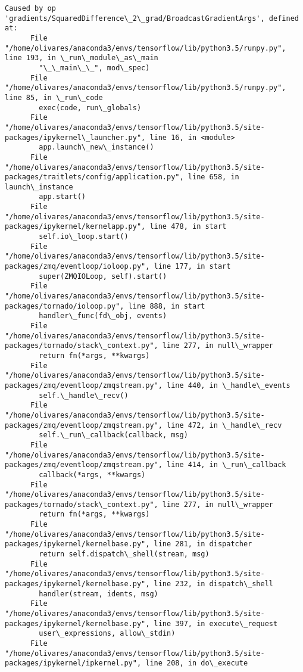 \documentclass[11pt]{article}
\begin{document}
\begin{Verbatim}[commandchars=\\\{\}]
    Caused by op 'gradients/SquaredDifference\_2\_grad/BroadcastGradientArgs', defined at:
      File "/home/olivares/anaconda3/envs/tensorflow/lib/python3.5/runpy.py", line 193, in \_run\_module\_as\_main
        "\_\_main\_\_", mod\_spec)
      File "/home/olivares/anaconda3/envs/tensorflow/lib/python3.5/runpy.py", line 85, in \_run\_code
        exec(code, run\_globals)
      File "/home/olivares/anaconda3/envs/tensorflow/lib/python3.5/site-packages/ipykernel\_launcher.py", line 16, in <module>
        app.launch\_new\_instance()
      File "/home/olivares/anaconda3/envs/tensorflow/lib/python3.5/site-packages/traitlets/config/application.py", line 658, in launch\_instance
        app.start()
      File "/home/olivares/anaconda3/envs/tensorflow/lib/python3.5/site-packages/ipykernel/kernelapp.py", line 478, in start
        self.io\_loop.start()
      File "/home/olivares/anaconda3/envs/tensorflow/lib/python3.5/site-packages/zmq/eventloop/ioloop.py", line 177, in start
        super(ZMQIOLoop, self).start()
      File "/home/olivares/anaconda3/envs/tensorflow/lib/python3.5/site-packages/tornado/ioloop.py", line 888, in start
        handler\_func(fd\_obj, events)
      File "/home/olivares/anaconda3/envs/tensorflow/lib/python3.5/site-packages/tornado/stack\_context.py", line 277, in null\_wrapper
        return fn(*args, **kwargs)
      File "/home/olivares/anaconda3/envs/tensorflow/lib/python3.5/site-packages/zmq/eventloop/zmqstream.py", line 440, in \_handle\_events
        self.\_handle\_recv()
      File "/home/olivares/anaconda3/envs/tensorflow/lib/python3.5/site-packages/zmq/eventloop/zmqstream.py", line 472, in \_handle\_recv
        self.\_run\_callback(callback, msg)
      File "/home/olivares/anaconda3/envs/tensorflow/lib/python3.5/site-packages/zmq/eventloop/zmqstream.py", line 414, in \_run\_callback
        callback(*args, **kwargs)
      File "/home/olivares/anaconda3/envs/tensorflow/lib/python3.5/site-packages/tornado/stack\_context.py", line 277, in null\_wrapper
        return fn(*args, **kwargs)
      File "/home/olivares/anaconda3/envs/tensorflow/lib/python3.5/site-packages/ipykernel/kernelbase.py", line 281, in dispatcher
        return self.dispatch\_shell(stream, msg)
      File "/home/olivares/anaconda3/envs/tensorflow/lib/python3.5/site-packages/ipykernel/kernelbase.py", line 232, in dispatch\_shell
        handler(stream, idents, msg)
      File "/home/olivares/anaconda3/envs/tensorflow/lib/python3.5/site-packages/ipykernel/kernelbase.py", line 397, in execute\_request
        user\_expressions, allow\_stdin)
      File "/home/olivares/anaconda3/envs/tensorflow/lib/python3.5/site-packages/ipykernel/ipkernel.py", line 208, in do\_execute

\end{Verbatim}
\end{document}
